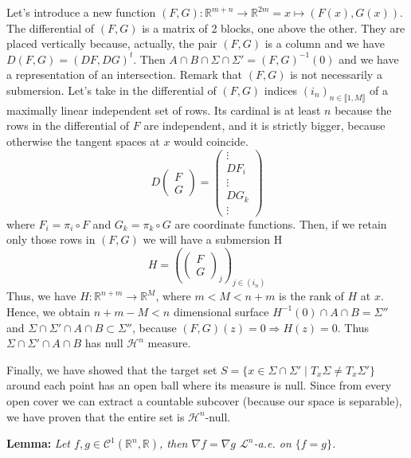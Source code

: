 \vspace{1ex}
Let's introduce a new function $(F, G):\mathbb R^{m+n}\rightarrow\mathbb R^{2m}
=x\mapsto (F(x),G(x))$. The differential of $(F,G)$ is a matrix of 2 blocks, one
above the other. They are placed vertically because, actually, the pair $(F,G)$ is
a column and we have $D(F,G)=(DF,DG)^t$. Then $A\cap B\cap\Sigma\cap\Sigma'=(F,G)
^{-1}(0)$ and we have a representation of an intersection. Remark
that $(F, G)$ is not necessarily a submersion. Let's take in the differential of $(F
,G)$ indices $(i_n)_{n\in\llbracket1,M\rrbracket}$ of a maximally linear
independent set of rows. Its cardinal is at least $n$ because the rows in the
differential of $F$ are independent, and it is strictly bigger, because otherwise
the tangent spaces at $x$ would coincide.
\[D\left(\begin{array}{cc} F\\ G\end{array}\right) =
    \left(\begin{array}{cc} \vdots \\DF_i\\ \vdots\\ DG_k\\ \vdots\end{array}\right)\]
where $F_i=\pi_i\circ F$ and $G_k=\pi_k\circ G$ are coordinate functions. Then,
if we retain only those rows in $(F,G)$ we will have a submersion H
\[H=\left(\left(\begin{array}{cc} F\\ G\end{array}\right)_j\right)_{j\in(i_n)}\]
Thus, we have $H:\mathbb R^{n+m}\rightarrow\mathbb R^{M}$, where $m<M<n+m$ is the
rank of $H$ at $x$. Hence, we obtain $n+m-M<n$ dimensional surface $H^{-1}(0)\cap
A\cap B=\Sigma''$ and $\Sigma\cap\Sigma'\cap A\cap B\subset\Sigma''$, because
$(F,G)(z)=0\Rightarrow H(z)=0$. Thus $\Sigma\cap\Sigma'\cap A\cap B$ has null
$\mathcal H^n$ measure.

\vspace{1ex}
Finally, we have showed that the target set $S=\{x\in\Sigma\cap\Sigma'\;|\;T_x\Sigma
\neq T_x\Sigma'\}$ around each point has an open ball where its measure is null.
Since from every open cover we can extract a countable subcover (because our
space is separable), we have proven that the entire set is $\mathcal H^n$-null.

\vspace{2ex}
\textbf{Lemma:} \textit{Let $f,g\in\mathcal C^1(\mathbb R^n, \mathbb R)$, then $\nabla f
=\nabla g$ $\mathcal L^n$-a.e. on $\{f=g\}$.}

